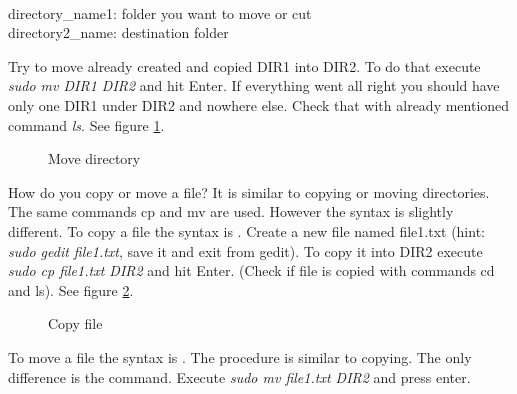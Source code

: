 \par \noindent {} \\

\par \noindent directory\_name1: folder you want to move or cut \\
directory2\_name: destination folder \\

\par \noindent Try to move already created and copied DIR1 into DIR2.  To do that execute \textit{sudo mv DIR1 DIR2} and hit Enter. If everything went all right you should have only one DIR1 under DIR2 and nowhere else. Check that with already mentioned command \textit{ls}. See figure \ref{fig:mv1}.

\begin{figure}[h!]	
	\centering
	\caption{Move directory}	
	\label{fig:mv1}	
\end{figure}

\par \noindent How do you copy or move a file? It is similar to copying or moving directories. The same commands cp and mv are used. However the syntax is slightly different. To copy a file the syntax is . Create a new file named file1.txt (hint:  \textit{sudo gedit file1.txt}, save it and exit from gedit). To copy it into DIR2 execute \textit{sudo  cp  file1.txt  DIR2} and hit Enter. (Check if file is copied with commands cd and ls). See figure \ref{fig:cp2}.

\begin{figure}[h!]	
	\centering
	\caption{Copy file}	
	\label{fig:cp2}	
\end{figure}

\par \noindent To move a file the syntax is . The procedure is similar to copying. The only difference is the command. Execute \textit{sudo mv file1.txt DIR2} and press enter. \\

